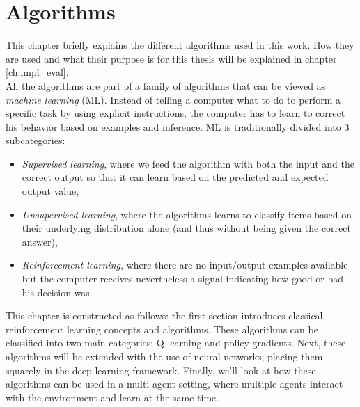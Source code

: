 \chapter{Algorithms}
\label{ch:algorithms}

This chapter briefly explains the different algorithms used in this work. How they are used and what their purpose is for this thesis will be explained in chapter \ref{ch:impl_eval}.\\
All the algorithms are part of a family of algorithms that can be viewed as \emph{machine learning} (ML). Instead of telling a computer what to do to perform a specific task by using explicit instructions, the computer has to learn to correct his behavior based on examples and inference. ML is traditionally divided into 3 subcategories:
\begin{itemize}
    \item \emph{Supervised learning}, where we feed the algorithm with both the input and the correct output so that it can learn based on the predicted and expected output value,
    \item \emph{Unsupervised learning}, where the algorithms learns to classify items based on their underlying distribution alone (and thus without being given the correct answer),
    \item \emph{Reinforcement learning}, where there are no input/output examples available but the computer receives nevertheless a signal indicating how good or bad his decision was.
\end{itemize}
This chapter is constructed as follows: the first section introduces classical reinforcement learning concepts and algorithms. These algorithms can be classified into two main categories: Q-learning and policy gradients. Next, these algorithms will be extended with the use of neural networks, placing them squarely in the deep learning framework. Finally, we'll look at how these algorithms can be used in a multi-agent setting, where multiple agents interact with the environment and learn at the same time.


